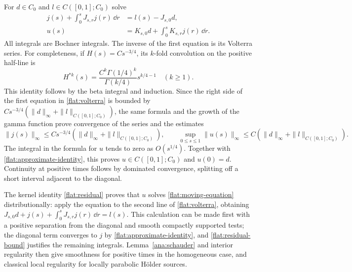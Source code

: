 For $d\in C_0$ and $l\in C([0,1];C_0)$ solve
\begin{equation}\label{flat:volterra}
 \begin{split}
 j(s)+\int_0^sJ_{s,r}j(r)\,\dd r&=l(s)-J_{s,0}d,\\
 u(s)&=K_{s,0}d+\int_0^sK_{s,r}j(r)\,\dd r.
 \end{split}
\end{equation}
All integrals are Bochner integrals. The inverse of the first equation
is its Volterra series. For completeness, if
$H(s)=Cs^{-3/4}$, its $k$-fold convolution on the positive half-line is
\[
 H^{*k}(s)
 =\frac{C^k\Gamma(1/4)^k}{\Gamma(k/4)}s^{k/4-1}
 \quad(k\ge1).
\]
This identity follows by the beta integral and induction. Since the
right side of the first equation in \eqref{flat:volterra} is bounded
by $Cs^{-3/4}(\|d\|_\infty+\|l\|_{C([0,1];C_0)})$, the same formula
and the growth of the gamma function prove convergence of the series
and the estimates
\begin{equation}\label{flat:evolution-bound}
 \|j(s)\|_\infty\le Cs^{-3/4}
       (\|d\|_\infty+\|l\|_{C([0,1];C_0)}),\qquad
 \sup_{0\le s\le1}\|u(s)\|_\infty
 \le C(\|d\|_\infty+\|l\|_{C([0,1];C_0)}).
\end{equation}
The integral in the formula for $u$ tends to zero as $O(s^{1/4})$.
Together with \eqref{flat:approximate-identity}, this proves
$u\in C([0,1];C_0)$ and $u(0)=d$. Continuity at positive times follows
by dominated convergence, splitting off a short interval adjacent to
the diagonal.

The kernel identity \eqref{flat:residual} proves that $u$ solves
\eqref{flat:moving-equation} distributionally: apply the equation to
the second line of \eqref{flat:volterra}, obtaining
$J_{s,0}d+j(s)+\int_0^sJ_{s,r}j(r)\,\dd r=l(s)$.
This calculation can be made first with a positive separation from
the diagonal and smooth compactly supported tests; the diagonal
term converges to $j$ by \eqref{flat:approximate-identity}, and
\eqref{flat:residual-bound} justifies the remaining integrals.
Lemma~\ref{ana:schauder} and interior regularity then give smoothness
for positive times in the homogeneous case, and classical local
regularity for locally parabolic H\"older sources.

